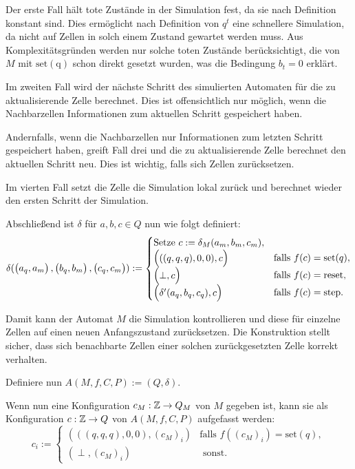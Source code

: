 \begin{definition}
    Der erste Fall hält tote Zustände in der Simulation fest, da sie nach Definition konstant sind. Dies ermöglicht nach Definition von $q^t$ eine schnellere Simulation, da nicht auf Zellen in solch einem Zustand gewartet werden muss. Aus Komplexitätsgründen werden nur solche toten Zustände berücksichtigt, die von $M$ mit $\mathrm{set(q)}$ schon direkt gesetzt wurden, was die Bedingung $b_t = 0$ erklärt.
    
    Im zweiten Fall wird der nächste Schritt des simulierten Automaten für die zu aktualisierende Zelle berechnet.
    Dies ist offensichtlich nur möglich, wenn
    die Nachbarzellen Informationen zum aktuellen Schritt gespeichert haben.
    
    Andernfalls, wenn die Nachbarzellen nur Informationen zum letzten Schritt gespeichert haben,
    greift Fall drei und die zu aktualisierende Zelle berechnet den aktuellen Schritt neu.
    Dies ist wichtig, falls sich Zellen zurücksetzen.
    
    Im vierten Fall setzt die Zelle die Simulation
    lokal zurück und berechnet wieder den ersten Schritt der Simulation.
    
    
    Abschließend ist $\delta$ für $a, b, c \in Q$ nun wie folgt definiert:
    \[
        \delta(\Spvek{a_q, a_m}, \Spvek{b_q, b_m}, \Spvek{c_q, c_m}) := 
        \begin{cases}
            \text{Setze } c := \delta_M(a_m, b_m, c_m), \\
            \Spvek{((q, q, q), 0, 0), c} & \text{falls } f(c) = \mathrm{set}(q), \\
            \Spvek{\perp, c} & \text{falls } f(c) = \mathrm{reset}, \\
            \Spvek{\delta'(a_q, b_q, c_q), c} & \text{falls } f(c) = \mathrm{step}.
        \end{cases}
    \]
    
    Damit kann der Automat $M$ die Simulation kontrollieren
    und diese für einzelne Zellen auf einen neuen Anfangszustand zurücksetzen. Die Konstruktion stellt sicher,
    dass sich benachbarte Zellen einer solchen zurückgesetzten Zelle
    korrekt verhalten.
    
    Definiere nun $A(M, f, C, P) := (Q, \delta)$.
    
    Wenn nun eine Konfiguration $c_M : \mathbb{Z} \to Q_M$ von $M$
    gegeben ist, kann sie als Konfiguration $c: \mathbb{Z} \to Q$ von $A(M, f, C, P)$
    aufgefasst werden:
    \[
        c_i :=
        \begin{cases}
            (((q, q, q), 0, 0), (c_M)_i) & \text{falls } f((c_M)_i) = \mathrm{set}(q), \\
            (\perp, (c_M)_i) & \text{ sonst.}
        \end{cases}
    \]
\end{definition}

